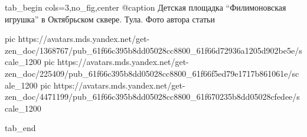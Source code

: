  
 
 
 
 


\ifcmt
  tab_begin cols=3,no_fig,center
     @caption Детская площадка \enquote{Филимоновская игрушка} в Октябрьском сквере. Тула. Фото автора статьи

     pic https://avatars.mds.yandex.net/get-zen_doc/1368767/pub_61f66c395b8dd05028cc8800_61f66d72936a1205d902be5e/scale_1200
     pic https://avatars.mds.yandex.net/get-zen_doc/225409/pub_61f66c395b8dd05028cc8800_61f66f5ed79e1717b861061e/scale_1200
     pic https://avatars.mds.yandex.net/get-zen_doc/4471199/pub_61f66c395b8dd05028cc8800_61f670235b8dd05028cfedee/scale_1200

  tab_end
\fi
